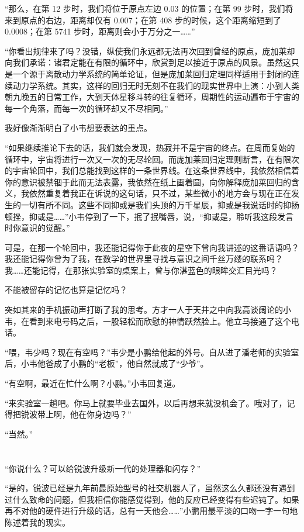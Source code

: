 \documentclass[punct=kaiming, zihao=5, openany, fontset=sikou]{ctexbook}
\begin{document}
“那么，在第 12 步时，我们将位于原点左边 $0.03$ 的位置；在第 99 步时，我们将来到原点的右边，距离却仅有 $0.007$；在第 408 步的时候，这个距离缩短到了 $0.0008$；在第 5741 步时，距离则会小于万分之一……”

“你看出规律来了吗？没错，纵使我们永远都无法再次回到曾经的原点，庞加莱却向我们承诺：诸君定能在有限的循环中，欣赏到足以接近于原点的风景。虽然这只是一个源于离散动力学系统的简单论证，但是庞加莱回归定理同样适用于封闭的连续动力学系统。其实，这样的回归无时无刻不在我们的现实世界中上演：小到人类朝九晚五的日常工作，大到天体星移斗转的往复循环，周期性的运动遍布于宇宙的每一个角落，而每一次的循环却又不尽相同。”

我好像渐渐明白了小韦想要表达的重点。

“如果继续推论下去的话，我们就会发现，热寂并不是宇宙的终点。在周而复始的循环中，宇宙将进行一次又一次的无尽轮回。而庞加莱回归定理则断言，在有限次的宇宙轮回中，我们总能找到这样的一条世界线。在这条世界线中，我依然相信着你的意识被禁锢于此而无法表露，我依然在纸上画着圆，向你解释庞加莱回归的含义，我依然重复着我正在诉说的这句话，只不过，某些微小的地方会与现在正在发生的一切有所不同。这些不同抑或是我们头顶的万千星辰，抑或是我说话时的抑扬顿挫，抑或是……”小韦停到了一下，抿了抿嘴唇，说，“抑或是，聆听我这段发言时你意识的觉醒。”

可是，在那一个轮回中，我还能记得你于此夜的星空下曾向我讲述的这番话语吗？我还能记得你曾为了我，在数学的世界里寻找与意识之间千丝万缕的联系吗？我……还能记得，在那张实验室的桌案上，曾与你湛蓝色的眼眸交汇目光吗？

不能被留存的记忆也算是记忆吗？

突如其来的手机振动声打断了我的思考。方才一人于天井之中向我高谈阔论的小韦，在看到来电号码之后，一股轻松而欣慰的神情跃然脸上。他立马接通了这个电话。

“喂，韦少吗？现在有空吗？”韦少是小鹏给他起的外号。自从进了潘老师的实验室后，小韦他爸成了小鹏的“老板”，他自然就成了“少爷”。

“有空啊，最近在忙什么啊？小鹏。”小韦回复道。

“来实验室一趟吧。你马上就要毕业去国外，以后再想来就没机会了。哦对了，记得把锐波带上啊，他在你身边吗？”

“当然。”

\section{}

“你说什么？可以给锐波升级新一代的处理器和闪存？”

“是的，锐波已经是九年前最原始型号的社交机器人了，虽然这么久都还没有遇到过什么致命的问题，但我相信你能感觉得到，他的反应已经变得有些迟钝了。如果再不对他的硬件进行升级的话，总有一天他会……”小鹏用最平淡的口吻一字一句地陈述着我的现实。
\end{document}

